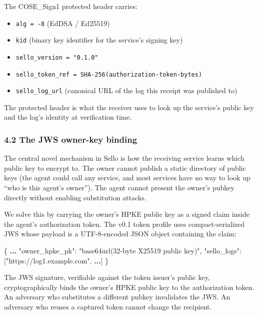 \documentclass[
  11pt,
]{article}
\newenvironment{Shaded}{}{}
\newcommand{\DataTypeTok}[1]{\textcolor[rgb]{0.56,0.13,0.00}{#1}}
\newcommand{\ErrorTok}[1]{\textcolor[rgb]{1.00,0.00,0.00}{\textbf{#1}}}
\newcommand{\FunctionTok}[1]{\textcolor[rgb]{0.02,0.16,0.49}{#1}}
\newcommand{\OtherTok}[1]{\textcolor[rgb]{0.00,0.44,0.13}{#1}}
\newcommand{\StringTok}[1]{\textcolor[rgb]{0.25,0.44,0.63}{#1}}
\providecommand{\tightlist}{%
  \setlength{\itemsep}{0pt}\setlength{\parskip}{0pt}}
\begin{document}
The COSE\_Sign1 protected header carries:

\begin{itemize}
\tightlist
\item
  \texttt{alg\ =\ -8} (EdDSA / Ed25519)
\item
  \texttt{kid} (binary key identifier for the service's signing key)
\item
  \texttt{sello\_version\ =\ "0.1.0"}
\item
  \texttt{sello\_token\_ref\ =\ SHA-256(authorization-token-bytes)}
\item
  \texttt{sello\_log\_url} (canonical URL of the log this receipt was
  published to)
\end{itemize}

The protected header is what the receiver uses to look up the service's
public key and the log's identity at verification time.

\hypertarget{the-jws-owner-key-binding}{%
\subsubsection{4.2 The JWS owner-key
binding}\label{the-jws-owner-key-binding}}

The central novel mechanism in Sello is how the receiving service learns
which public key to encrypt to. The owner cannot publish a static
directory of public keys (the agent could call any service, and most
services have no way to look up ``who is this agent's owner''). The
agent cannot present the owner's pubkey directly without enabling
substitution attacks.

We solve this by carrying the owner's HPKE public key as a signed claim
inside the agent's authorization token. The v0.1 token profile uses
compact-serialized JWS \citep{RFC7515} whose payload is a UTF-8-encoded
JSON object containing the claim:

\begin{Shaded}
\begin{Highlighting}[]
\FunctionTok{\{}
  \ErrorTok{...}
  \DataTypeTok{"owner\_hpke\_pk"}\FunctionTok{:} \StringTok{"base64url(32{-}byte X25519 public key)"}\FunctionTok{,}
  \DataTypeTok{"sello\_logs"}\FunctionTok{:} \OtherTok{[}\StringTok{"https://log1.example.com"}\OtherTok{,} \ErrorTok{...}\OtherTok{]}
\FunctionTok{\}}
\end{Highlighting}
\end{Shaded}

The JWS signature, verifiable against the token issuer's public key,
cryptographically binds the owner's HPKE public key to the authorization
token. An adversary who substitutes a different pubkey invalidates the
JWS. An adversary who reuses a captured token cannot change the
recipient.
\end{document}

